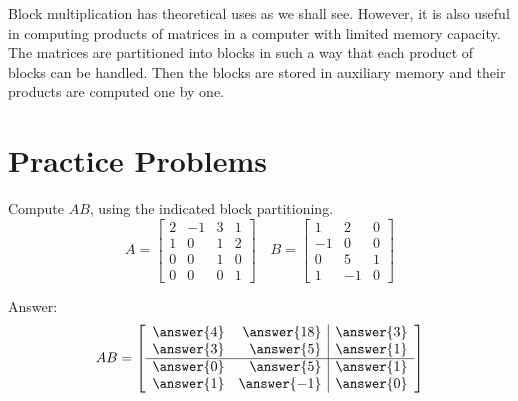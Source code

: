 \documentclass{ximera}
\begin{document}
Block multiplication has theoretical uses as we shall see. However, it is also useful in computing products of matrices in a computer with limited memory capacity. The matrices are partitioned into blocks in such a way that each product of blocks can be handled. Then the blocks are stored in auxiliary memory and their products are computed one by one.

\section*{Practice Problems}

\begin{problem}\label{prob:blockmatmult1}
Compute $AB$, using the indicated block partitioning.
\begin{equation*}
A = \left[ \begin{array}{rr|rr}
2 & -1 & 3 & 1 \\
1 & 0  & 1 & 2 \\
\hline
0 & 0 & 1 & 0 \\
0 & 0 & 0 & 1
\end{array} \right] \quad
B = \left[ \begin{array}{rr|r}
1 & 2 & 0 \\
-1 & 0  & 0 \\
\hline
0 & 5 & 1 \\
1 & -1 & 0 
\end{array} \right]
\end{equation*}

Answer:
\begin{equation*}
AB = \left[ \begin{array}{rr|r}
\answer{4} & \answer{18} & \answer{3} \\
\answer{3} & \answer{5}  & \answer{1} \\
\hline
\answer{0} & \answer{5} & \answer{1} \\
\answer{1} & \answer{-1} & \answer{0}
\end{array} \right] 
\end{equation*}

\end{problem}
\end{document}
